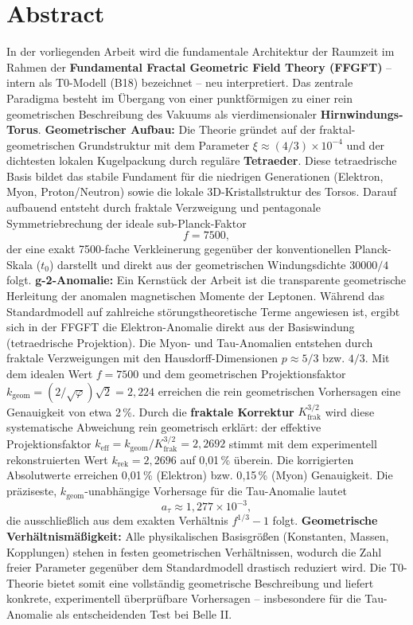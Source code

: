 \section*{Abstract}
		In der vorliegenden Arbeit wird die fundamentale Architektur der Raumzeit im Rahmen der \textbf{Fundamental Fractal Geometric Field Theory (FFGFT)} – intern als T0-Modell (B18) bezeichnet – neu interpretiert. Das zentrale Paradigma besteht im Übergang von einer punktförmigen zu einer rein geometrischen Beschreibung des Vakuums als vierdimensionaler \textbf{Hirnwindungs-Torus}.
		\textbf{Geometrischer Aufbau:} Die Theorie gründet auf der fraktal-geometrischen Grundstruktur mit dem Parameter $\xi \approx (4/3)\times 10^{-4}$ und der dichtesten lokalen Kugelpackung durch reguläre \textbf{Tetraeder}. Diese tetraedrische Basis bildet das stabile Fundament für die niedrigen Generationen (Elektron, Myon, Proton/Neutron) sowie die lokale 3D-Kristallstruktur des Torsos. Darauf aufbauend entsteht durch fraktale Verzweigung und pentagonale Symmetriebrechung der ideale sub-Planck-Faktor
		\begin{equation*}
			f = 7500,
		\end{equation*}
		der eine exakt 7500-fache Verkleinerung gegenüber der konventionellen Planck-Skala ($t_0$) darstellt und direkt aus der geometrischen Windungsdichte $30000/4$ folgt.
		\textbf{g-2-Anomalie:} Ein Kernstück der Arbeit ist die transparente geometrische Herleitung der anomalen magnetischen Momente der Leptonen. Während das Standardmodell auf zahlreiche störungstheoretische Terme angewiesen ist, ergibt sich in der FFGFT die Elektron-Anomalie direkt aus der Basiswindung (tetraedrische Projektion). Die Myon- und Tau-Anomalien entstehen durch fraktale Verzweigungen mit den Hausdorff-Dimensionen $p \approx 5/3$ bzw. $4/3$. Mit dem idealen Wert $f = 7500$ und dem geometrischen Projektionsfaktor $k_\text{geom} = (2/\sqrt{\varphi})\sqrt{2} = 2{,}224$ erreichen die rein geometrischen Vorhersagen eine Genauigkeit von etwa 2\,\%. Durch die \textbf{fraktale Korrektur} $K_\text{frak}^{3/2}$ wird diese systematische Abweichung rein geometrisch erklärt: der effektive Projektionsfaktor $k_\text{eff} = k_\text{geom} / K_\text{frak}^{3/2} = 2{,}2692$ stimmt mit dem experimentell rekonstruierten Wert $k_\text{rek} = 2{,}2696$ auf 0{,}01\,\% überein. Die korrigierten Absolutwerte erreichen 0{,}01\,\% (Elektron) bzw. 0{,}15\,\% (Myon) Genauigkeit. Die präziseste, $k_\text{geom}$-unabhängige Vorhersage für die Tau-Anomalie lautet
		\begin{equation*}
			a_\tau \approx 1{,}277 \times 10^{-3},
		\end{equation*}
		die ausschließlich aus dem exakten Verhältnis $f^{1/3} - 1$ folgt.
		\textbf{Geometrische Verhältnismäßigkeit:} Alle physikalischen Basisgrößen (Konstanten, Massen, Kopplungen) stehen in festen geometrischen Verhältnissen, wodurch die Zahl freier Parameter gegenüber dem Standardmodell drastisch reduziert wird. Die T0-Theorie bietet somit eine vollständig geometrische Beschreibung und liefert konkrete, experimentell überprüfbare Vorhersagen – insbesondere für die Tau-Anomalie als entscheidenden Test bei Belle II.

